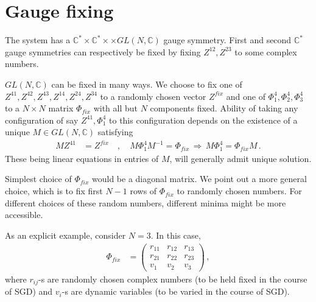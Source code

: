 \documentclass[12pt,a4paper]{JHEP3}
\begin{document}
\section{Gauge fixing}\label{appgauuge}
The system has a $\mathbb{C}^\ast  \times \mathbb{C}^\ast \times \times GL(N, \mathbb{C})$ gauge symmetry.
First and second $\mathbb{C}^\ast$ gauge symmetries can respectively be fixed by fixing $Z^{12}, Z^{23}$ to some complex numbers. 

$GL(N, \mathbb{C})$ can be fixed in many ways. We choose to fix one of $Z^{41}, Z^{42}, Z^{43}, Z^{14}, Z^{24}, Z^{34}$ to a randomly chosen vector $Z^{fix}$ and one of $\Phi^{4}_1, \Phi^{4}_2, \Phi^{4}_3$ to a $N \times N$ matrix $\Phi_{fix}$ with all but $N$ components fixed.
Ability of taking any configuration of say $Z^{41}, \Phi^4_1 $ to this configuration depends on the existence of a unique $M \in GL(N, \mathbb{C})$ satisfying
\begin{align}
M Z^{41} &= Z^{fix} \quad , \quad M \Phi^4_1 M^{-1} = \Phi_{fix} \, \Rightarrow \, M \Phi^4_1 = \Phi_{fix} M \, .
\end{align}
These being linear equations in entries of $M$, will generally admit unique solution.

Simplest choice of $\Phi_{fix}$ would be a diagonal matrix. We point out a more general choice, which is to fix first $N-1$ rows of $\Phi_{fix}$ to randomly chosen numbers. For different choices of these random numbers, different minima might be more accessible.

As an explicit example, consider $N=3$. In  this case, 
\begin{align}
\Phi_{fix} &=
\begin{pmatrix}
r_{11} & r_{12} & r_{13} \\
r_{21} & r_{22} & r_{23} \\
v_1 & v_2 & v_3
\end{pmatrix} \, ,
\end{align}
where $r_{ij}$-s are randomly chosen complex numbers (to be held fixed in the course of SGD) and $v_i$-s are dynamic variables (to be varied in the course of SGD).

\end{document}
